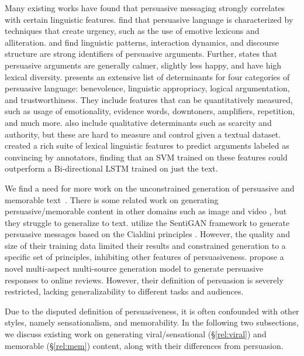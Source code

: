 Many existing works have found that persuasive messaging strongly correlates with certain linguistic features. \citet{cano-basave-he-2016-study} find that persuasive language is characterized by techniques that create urgency, such as the use of emotive lexicons and alliteration. \citet{tan2016} and \citet{li2020} find linguistic patterns, interaction dynamics, and discourse structure are strong identifiers of persuasive arguments. Further, \citet{tan2016} states that persuasive arguments are generally calmer, slightly less happy, and have high lexical diversity. \citet{duerr-2021} presents an extensive list of determinants for four categories of persuasive language: benevolence, linguistic appropriacy, logical argumentation, and trustworthiness. They include features that can be quantitatively measured, such as usage of emotionality, evidence words, downtoners, amplifiers, repetition, and much more. \citet{duerr-2021} also include qualitative determinants such as scarcity and authority, but these are hard to measure and control given a textual dataset. \citet{habernal-gurevych-2016-argument} created a rich suite of lexical linguistic features to predict arguments labeled as convincing by annotators, finding that an SVM trained on these features could outperform a Bi-directional LSTM trained on just the text.

We find a need for more work on the unconstrained generation of persuasive and memorable text~\citep{duerr-2021, van-noort-2020-automatic}. There is some related work on generating persuasive/memorable content in other domains such as image and video \citep{liu2021ai, kyle2020generating}, but they struggle to generalize to text. \citet{lipa-urbina-2021} utilize the SentiGAN \citep{sentigan-wang} framework to generate persuasive messages based on the Cialdini principles \citep{cialdini2009influence}. However, the quality and size of their training data limited their results and constrained generation to a specific set of principles, inhibiting other features of persuasiveness. \citet{chen2022generating} propose a novel multi-aspect multi-source generation model to generate persuasive responses to online reviews. However, their definition of persuasion is severely restricted, lacking generalizability to different tasks and audiences.


Due to the disputed definition of persuasiveness, it is often confounded with other styles, namely sensationalism, and memorability. In the following two subsections, we discuss existing work on generating viral/sensational (\S\ref{rel:viral}) and memorable (\S\ref{rel:mem}) content, along with their differences from persuasion.

